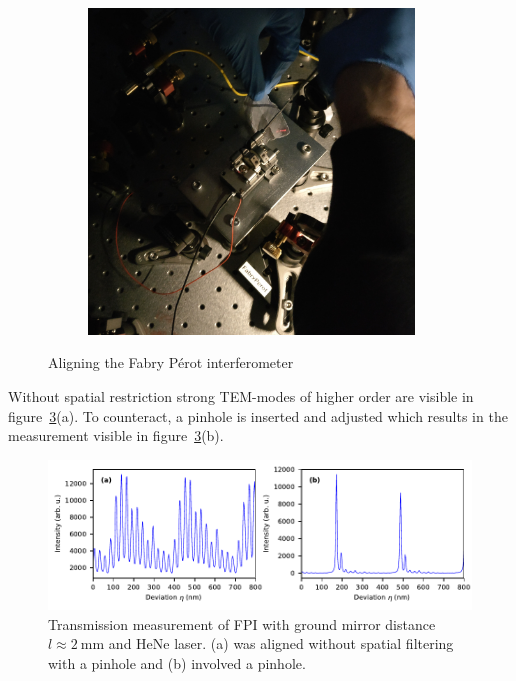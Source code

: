\begin{figure}[H]
\begin{subfigure}[b]{0.48\textwidth}
		\includegraphics[width=0.95\textwidth]{figures/fabry-perot/setup/confocal-setup-higher-modes-2}
		\caption{}
		\label{fig:confocal-setup-higher-modes-2}
	\end{subfigure}
	\caption{Aligning the Fabry Pérot interferometer}
	\label{fig:align-fpi}
\end{figure}

Without spatial restriction strong TEM-modes of higher order are visible in figure~\ref{fig:measurement-fabry-perot-hene}(a).
To counteract, a pinhole is inserted and adjusted which results in the measurement visible in figure~\ref{fig:measurement-fabry-perot-hene}(b).

\begin{figure}[H]
	\centering
	\includegraphics[width=\linewidth]{figures/fabry-perot/plots/measurement-fabry-perot-HeNe}
	\caption{Transmission measurement of FPI with ground mirror distance $l \approx \SI{2}{\milli \meter}$ and HeNe laser. (a) was aligned without spatial filtering with a pinhole and (b) involved a pinhole.}
	\label{fig:measurement-fabry-perot-hene}
\end{figure}

